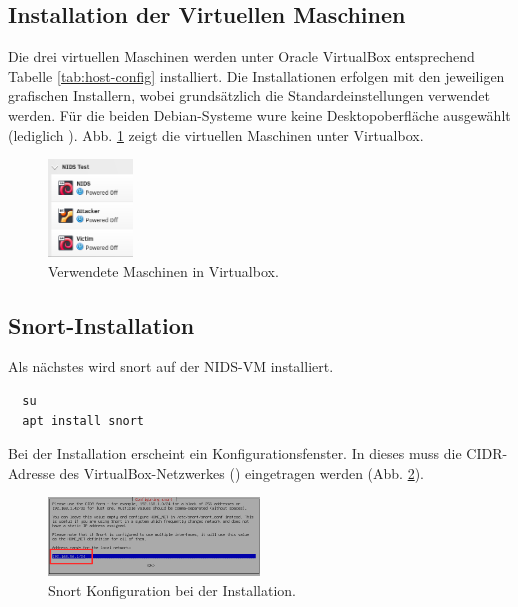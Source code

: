 \subsection{Installation der Virtuellen Maschinen}
Die drei virtuellen Maschinen werden unter Oracle VirtualBox entsprechend Tabelle \ref{tab:host-config} installiert. Die Installationen erfolgen mit den jeweiligen grafischen Installern, wobei grundsätzlich die Standardeinstellungen verwendet werden. Für die beiden Debian-Systeme wure keine Desktopoberfläche ausgewählt (lediglich ). Abb. \ref{fig:vbox-group} zeigt die virtuellen Maschinen unter Virtualbox.

\begin{figure}[h]
  \centering
  \includegraphics[width=0.2\textwidth]{graphics/setup/vbox_group.png}
  \caption{Verwendete Maschinen in Virtualbox.}\label{fig:vbox-group}
\end{figure}

\subsection{Snort-Installation}

Als nächstes wird snort auf der NIDS-VM installiert.
\begin{verbatim}
  su
  apt install snort
\end{verbatim}

Bei der Installation erscheint ein Konfigurationsfenster. In dieses muss die CIDR-Adresse des VirtualBox-Netzwerkes () eingetragen werden (Abb. \ref{fig:snort-first-time-setup}).

\begin{figure}[H]
  \centering
  \includegraphics[width=0.5\textwidth]{graphics/setup/config-snort-1.png}
  \caption{Snort Konfiguration bei der Installation.}\label{fig:snort-first-time-setup}
\end{figure}


